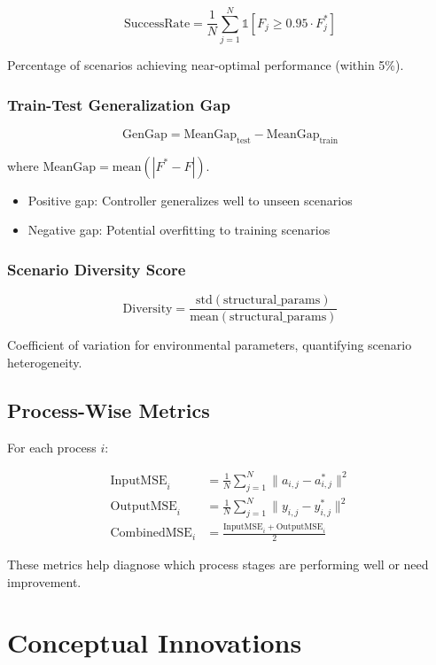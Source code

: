 \documentclass[11pt,a4paper]{article}
\begin{document}
$$
\text{SuccessRate} = \frac{1}{N} \sum_{j=1}^{N} \mathbb{1}[F_j \geq 0.95 \cdot F^*_j]
$$

Percentage of scenarios achieving near-optimal performance (within 5\%).

\subsubsection{Train-Test Generalization Gap}

$$
\text{GenGap} = \text{MeanGap}_{\text{test}} - \text{MeanGap}_{\text{train}}
$$

where $\text{MeanGap} = \text{mean}(|F^* - F|)$.

\begin{itemize}
    \item Positive gap: Controller generalizes well to unseen scenarios
    \item Negative gap: Potential overfitting to training scenarios
\end{itemize}

\subsubsection{Scenario Diversity Score}

$$
\text{Diversity} = \frac{\text{std}(\text{structural\_params})}{\text{mean}(\text{structural\_params})}
$$

Coefficient of variation for environmental parameters, quantifying scenario heterogeneity.

\subsection{Process-Wise Metrics}

For each process $i$:

\begin{align*}
\text{InputMSE}_i &= \frac{1}{N} \sum_{j=1}^{N} \| a_{i,j} - a^*_{i,j} \|^2 \\
\text{OutputMSE}_i &= \frac{1}{N} \sum_{j=1}^{N} \| y_{i,j} - y^*_{i,j} \|^2 \\
\text{CombinedMSE}_i &= \frac{\text{InputMSE}_i + \text{OutputMSE}_i}{2}
\end{align*}

These metrics help diagnose which process stages are performing well or need improvement.

\section{Conceptual Innovations}
\end{document}
